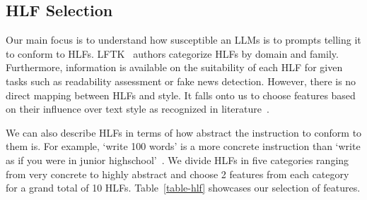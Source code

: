 \documentclass[runningheads,a4paper,11pt]{article}
\begin{document}
\subsection{HLF Selection}\label{hlf-selection}

Our main focus is to understand how susceptible an LLMs is to prompts telling it
to conform to HLFs.
LFTK~\cite{lftk-2023} authors categorize HLFs by domain and family.
Furthermore, information is available on the suitability of each HLF for given
tasks such as readability assessment or fake news detection.
However, there is no direct mapping between HLFs and style.
It falls onto us to choose features based on their influence over text style as
recognized in literature~\cite{verma2019lexical,lugea2023stylistics}.

We can also describe HLFs in terms of how abstract the instruction to conform to
them is.
For example, `write 100 words' is a more concrete instruction than `write as if
you were in junior highschool'~\cite{kincaid1975derivation}.
We divide HLFs in five categories ranging from very concrete to highly abstract
and choose 2 features from each category for a grand total of 10 HLFs.
Table~\ref{table-hlf} showcases our selection of features.
\end{document}
